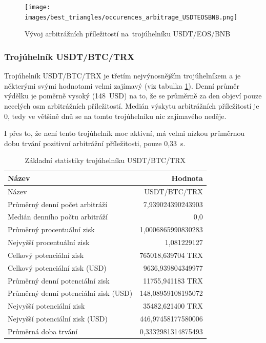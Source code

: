 \documentclass[thesis=B,czech]{FITthesis}[2019/03/21]
\begin{document}
\begin{figure}\centering
	\texttt{[image: images/best\_triangles/occurences\_arbitrage\_USDTEOSBNB.png]}
	\caption{Vývoj arbitrážních příležitostí na~trojúhelníku USDT/EOS/BNB }\label{occurences_arbitrage_USDTEOSBNB}
\end{figure}

\subsubsection{Trojúhelník USDT/BTC/TRX}
Trojúhelník USDT/BTC/TRX je třetím nejvýnosnějším trojúhelníkem a je některými svými hodnotami velmi zajímavý (viz tabulka \ref{USDTBTCTRX_stats}). Denní průměr výdělku je poměrně vysoký (148~USD) na to, že se průměrně za den objeví pouze necelých osm arbitrážních příležitostí. Medián výskytu arbitrážních příležitostí je 0, tedy ve většině dnů se na tomto trojúhelníku nic zajímavého neděje.

I přes to, že není tento trojúhelník moc aktivní, má velmi nízkou průměrnou dobu trvání pozitivní arbitrážní příležitosti, pouze 0,33~s. 

\begin{table}\centering
\caption{Základní statistiky trojúhelníku USDT/BTC/TRX}
\label{USDTBTCTRX_stats}
\begin{tabular}{|| l | r ||}
\hline Název & Hodnota \\ 
\hline\hline Název & USDT/BTC/TRX \\ 
\hline Průměrný denní počet arbitráží & 7,939024390243903 \\ 
\hline Medián denního počtu arbitráží & 0,0 \\ 
\hline Průměrný procentuální zisk & 1,0006865990830283 \\ 
\hline Nejvyšší procentuální zisk & 1,081229127 \\ 
\hline Celkový potenciální zisk & 765018,639704 TRX \\ 
\hline Celkový potenciální zisk (USD) & 9636,939804349977 \\ 
\hline Průměrný denní potenciální zisk & 11755,941183 TRX \\ 
\hline Průměrný denní potenciální zisk (USD) & 148,08959108195072 \\ 
\hline Nejvyšší potenciální zisk & 35482,621400 TRX \\ 
\hline Nejvyšší potenciální zisk (USD) & 446,97458177580006 \\ 
\hline Průměrná doba trvání & 0,3332981314875493 \\ 
\hline
\end{tabular}
\end{table}
\end{document}
